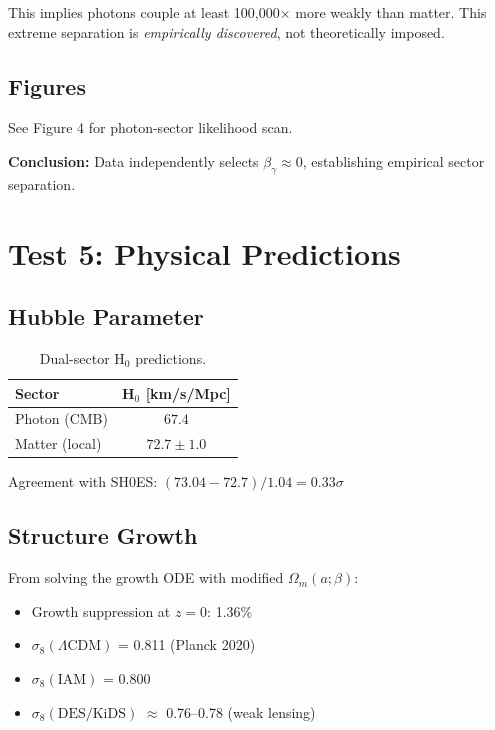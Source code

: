 \documentclass[11pt,letterpaper]{article}
\begin{document}
\noindent This implies photons couple at least 100,000$\times$ more weakly than matter. This extreme separation is \textit{empirically discovered}, not theoretically imposed.

\subsection{Figures}

See Figure 4 for photon-sector likelihood scan.

\noindent\textbf{Conclusion:} Data independently selects $\beta_\gamma \approx 0$, establishing empirical sector separation.

\section{Test 5: Physical Predictions}

\subsection{Hubble Parameter}

\begin{table}[h]
\centering
\begin{tabular}{lc}
\toprule
Sector & H$_0$ [km/s/Mpc] \\
\midrule
Photon (CMB) & $67.4$ \\
Matter (local) & $72.7 \pm 1.0$ \\
\bottomrule
\end{tabular}
\caption{Dual-sector H$_0$ predictions.}
\end{table}

\noindent Agreement with SH0ES: $(73.04 - 72.7)/1.04 = 0.33\sigma$

\subsection{Structure Growth}

From solving the growth ODE with modified $\Omega_m(a; \beta)$:

\begin{itemize}
\item Growth suppression at $z=0$: 1.36\%
\item $\sigma_8(\Lambda\text{CDM})$ = 0.811 (Planck 2020)
\item $\sigma_8(\text{IAM})$ = 0.800
\item $\sigma_8(\text{DES/KiDS})$ $\approx$ 0.76--0.78 (weak lensing)
\end{itemize}
\end{document}

